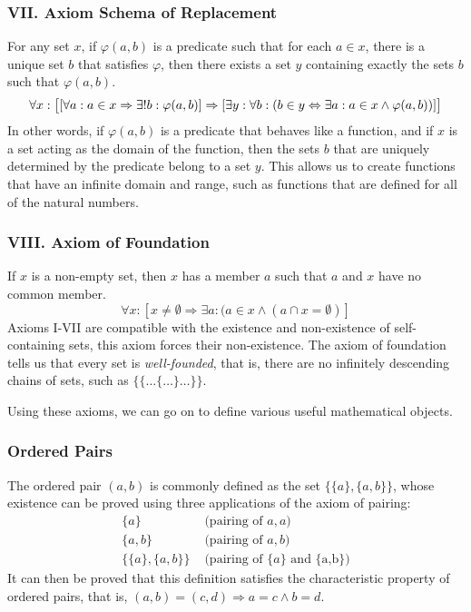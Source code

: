 \documentclass[11pt]{article}
\theoremstyle{definition}
\theoremstyle{theorem}
\theoremstyle{lemma}
\begin{document}
\subsubsection*{VII. Axiom Schema of Replacement}
For any set $x$, if $\varphi(a,b)$ is a predicate such that for each $a\in x$, there is a unique set $b$ that satisfies $\varphi$, then there exists a set $y$ containing exactly the sets $b$ such that $\varphi(a,b)$.
$$\forall x: \big{[}[\forall a: a\in x \Rightarrow \exists! b: \varphi(a,b)]
  \Rightarrow [\exists y: \forall b: (b \in y \Leftrightarrow \exists a: a\in x \wedge \varphi(a,b))]\big{]}$$
In other words, if $\varphi(a,b)$ is a predicate that behaves like a function, and if $x$ is a set acting as the domain of the function, then the sets $b$ that are uniquely determined by the predicate belong to a set $y$. This allows us to create functions that have an infinite domain and range, such as functions that are defined for all of the natural numbers.

\subsubsection*{VIII. Axiom of Foundation}
If $x$ is a non-empty set, then $x$ has a member $a$ such that $a$ and $x$ have no common member.
$$\forall x: [x \neq \emptyset \Rightarrow \exists a: (a\in x \wedge (a \cap x = \emptyset)]$$
Axioms I-VII are compatible with the existence and non-existence of self-containing sets, this axiom forces their non-existence. The axiom of foundation tells us that every set is \emph{well-founded}, that is, there are no infinitely descending chains of sets, such as $\{\{\ldots\{\ldots\}\ldots\}\}$.

Using these axioms, we can go on to define various useful mathematical objects.

\subsubsection*{Ordered Pairs}
The ordered pair $(a,b)$ is commonly defined as the set $\{\{a\},\{a,b\}\}$, whose existence can be proved using three applications of the axiom of pairing:
\begin{align*}
  \{a\} & \text{  (pairing of $a,a$)} \\
  \{a,b\} & \text{  (pairing of $a,b$)} \\
  \{\{a\}, \{a,b\}\} & \text{  (pairing of $\{a\}$ and \{a,b\})}
\end{align*}
It can then be proved that this definition satisfies the characteristic property of ordered pairs, that is, $(a,b) = (c,d) \Rightarrow a=c \wedge b=d$.
\end{document}
